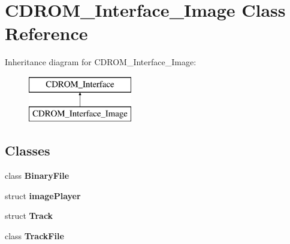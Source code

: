 \hypertarget{classCDROM__Interface__Image}{\section{C\-D\-R\-O\-M\-\_\-\-Interface\-\_\-\-Image Class Reference}
\label{classCDROM__Interface__Image}
}
Inheritance diagram for C\-D\-R\-O\-M\-\_\-\-Interface\-\_\-\-Image\-:\begin{figure}[H]
\begin{center}
\leavevmode
\includegraphics[height=2.000000cm]{classCDROM__Interface__Image}
\end{center}
\end{figure}
\subsection*{Classes}
\begin{DoxyCompactItemize}
\item 
class {\bfseries Binary\-File}
\item 
struct {\bfseries image\-Player}
\item 
struct {\bfseries Track}
\item 
class {\bfseries Track\-File}
\end{DoxyCompactItemize}
